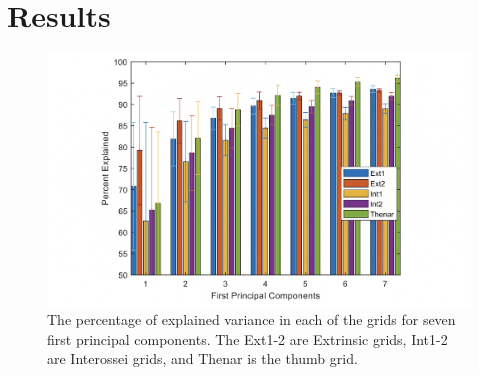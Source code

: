 \documentclass[conference]{IEEEtran}
\begin{document}
\section{Results}
\begin{figure}
    \centering
    \includegraphics[width=\columnwidth]{figure4.png}
    \caption{The percentage of explained variance in each of the grids for seven first principal 
components. The Ext1-2 are Extrinsic grids, Int1-2 are Interossei grids, and Thenar is the thumb grid.}
    \label{figure4}
\end{figure}
\end{document}
